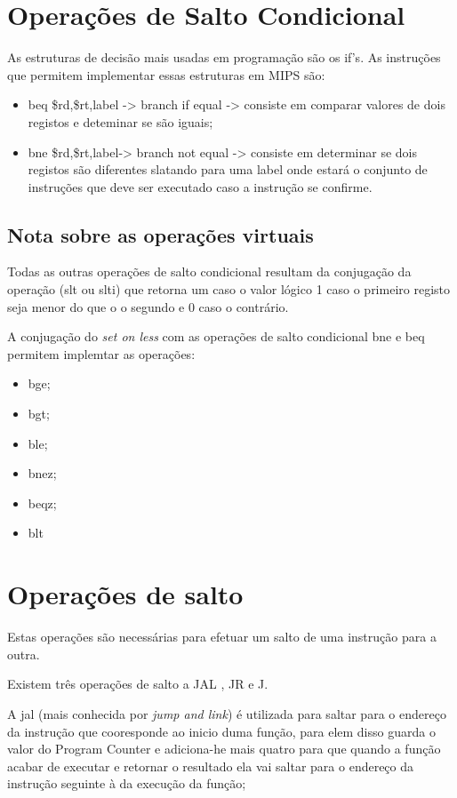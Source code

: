 \documentclass[10pt,a4paper]{book}
\begin{document}
  \section{Operações de Salto Condicional}

  As estruturas de decisão mais usadas em programação são os if's. As instruções que permitem implementar essas estruturas em MIPS são:
    \begin{itemize}
     \item beq \$rd,\$rt,label -> branch if equal -> consiste em comparar valores de dois registos e deteminar se são iguais;
     \item bne \$rd,\$rt,label-> branch not equal -> consiste em determinar se dois registos são diferentes slatando para uma label onde estará o conjunto de instruções que deve ser executado caso a instrução se confirme.
    \end{itemize}

     \subsection{Nota sobre as operações virtuais}

	Todas as outras operações de salto condicional resultam da conjugação da operação (slt ou slti) que retorna um caso o valor lógico 1 caso o primeiro registo seja menor do que o o segundo e 0 caso o contrário.

	A conjugação do \textit{set on less} com as operações de salto condicional bne e beq permitem implemtar as operações:
	    \begin{itemize}
	     \item bge;
	     \item bgt;
	     \item ble;
	     \item bnez;
	     \item beqz;
	     \item blt
	   \end{itemize}




 	\section{Operações de salto}

 		Estas operações são necessárias para efetuar um salto de uma instrução para a outra.

 		Existem três operações de salto a JAL , JR e J.

 		A jal (mais conhecida por \textit{jump and link}) é utilizada para saltar para o endereço da instrução que cooresponde ao inicio duma função, para elem disso guarda o valor do Program Counter e adiciona-he mais quatro para que quando a função acabar de executar e retornar o resultado ela vai saltar para o endereço da instrução seguinte à da execução da função;
\end{document}
